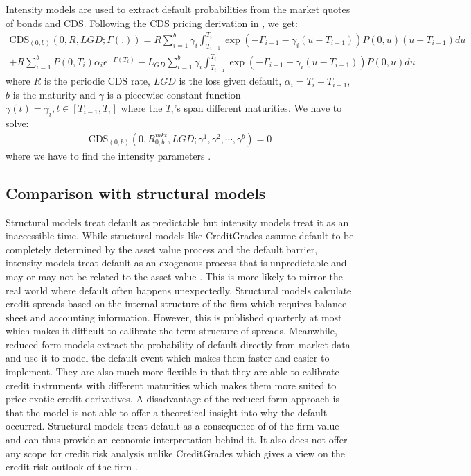 \documentclass[11t,a4paper]{article}
\begin{document}
Intensity models are used to extract default probabilities from the market quotes of bonds and CDS. Following the CDS pricing derivation in \cite{Brigobook}, we get:
\begin{multline}
\text{CDS}_{(0,b)}(0, R, LGD; \Gamma(.)) = R\sum^{b}_{i=1} \gamma_i \int^{T_i}_{T_{i-1}} \exp(-\Gamma_{i-1}-\gamma_i(u-T_{i-1})) P(0,u)(u-T_{i-1})du \\
+ R \sum^{b}_{i=1}P(0,T_i)\alpha_ie^{-\Gamma(T_i)} - L_{GD}\sum^{b}_{i=1} \gamma_i \int^{T_i}_{T_{i-1}} \exp(-\Gamma_{i-1}-\gamma_i(u-T_{i-1}))P(0,u)du 
\end{multline}
where $R$ is the periodic CDS rate, $LGD$ is the loss given default, $\alpha_i=T_i-T_{i-1}$, $b$ is the maturity and $\gamma$ is a piecewise constant function $\gamma(t) = \gamma_i, t\in[T_{i-1},T_i]$ where the $T_i$'s span different maturities. We have to solve:
\begin{align}
    \text{CDS}_{(0,b)}(0, R^{mkt}_{0,b}, LGD; \gamma^1, \gamma^2,\cdots,\gamma^b) = 0
\end{align}
where we have to find the intensity parameters \cite{Brigobook}. 


\subsection{Comparison with structural models}
Structural models treat default as predictable but intensity models treat it as an inaccessible time. While structural models like CreditGrades assume default to be completely determined by the asset value process and the default barrier, intensity models treat default as an exogenous process that is unpredictable and may or may not be related to the asset value \cite {comparison}. This is more likely to mirror the real world where default often happens unexpectedly. Structural models calculate credit spreads based on the internal structure of the firm which requires balance sheet and accounting information. However, this is published quarterly at most which makes it difficult to calibrate the term structure of spreads. Meanwhile, reduced-form models extract the probability of default directly from market data and use it to model the default event which makes them faster and easier to implement. They are also much more flexible in that they are able to calibrate credit instruments with different maturities which makes them more suited to price exotic credit derivatives. A disadvantage of the reduced-form approach is that the model is not able to offer a theoretical insight into why the default occurred. Structural models treat default as a consequence of of the firm value and can thus provide an economic interpretation behind it.  It also does not offer any scope for credit risk analysis unlike CreditGrades which gives a view on the credit risk outlook of the firm \cite{cgtechdoc}. 
\end{document}
